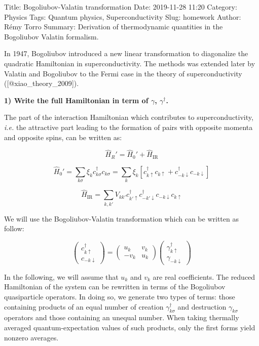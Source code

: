 Title: Bogoliubov-Valatin transformation Date: 2019-11-28 11:20
Category: Physics Tags: Quantum physics, Superconductivity Slug:
homework Author: Rémy Torro Summary: Derivation of thermodynamic
quantities in the Bogoliubov Valatin formalism.

 In 1947, Bogoliubov introduced a new linear transformation to
diagonalize the quadratic Hamiltonian in superconductivity. The methods
was extended later by Valatin and Bogoliubov to the Fermi case in the
theory of superconductivity ({[}@xiao\_theory\_2009{]}).

\textbf{1) Write the full Hamiltonian in term of \(\gamma\),
\(\gamma^\dagger\).}

The part of the interaction Hamiltonian which contributes to
superconductivity, \emph{i.e.} the attractive part leading to the
formation of pairs with opposite momenta and opposite spins, can be
written as:

\[ \hat{H}_{R}' = \hat{H}_{0}' + \hat{H}_{\textrm{IR}}\]

\[ \hat{H}_0' = \sum_{k\sigma} \xi_k c_{k\sigma}^\dagger c_{k\sigma}  = \sum_k \xi_k [c_{k\uparrow}^\dagger c_{k\uparrow} + c_{-k\downarrow}^\dagger c_{-k\downarrow}]\]

\[ \hat{H}_{\textrm{IR}} = \sum_{k,k'} V_{kk'} c_{k'\uparrow}^\dagger c_{-k'\downarrow}^\dagger c_{-k\downarrow} c_{k\uparrow}\]

We will use the Bogoliubov-Valatin transformation which can be written
as follow:

\[\begin{pmatrix}c_{k\uparrow}^\dagger \\ c_{-k\downarrow}\end{pmatrix} = \begin{pmatrix}u_k & v_k \\ -v_k & u_k \end{pmatrix}\begin{pmatrix}\gamma_{k\uparrow}^\dagger \\ \gamma_{-k\downarrow}\end{pmatrix}\]

In the following, we will assume that \(u_k\) and \(v_k\) are real
coefficients. The reduced Hamiltonian of the system can be rewritten in
terms of the Bogoliubov quasiparticle operators. In doing so, we
generate two types of terms: those containing products of an equal
number of creation \(\gamma^\dagger_{k\sigma}\) and destruction
\(\gamma_{k\sigma}\) operators and those containing an unequal number.
When taking thermally averaged quantum-expectation values of such
products, only the first forms yield nonzero averages.

